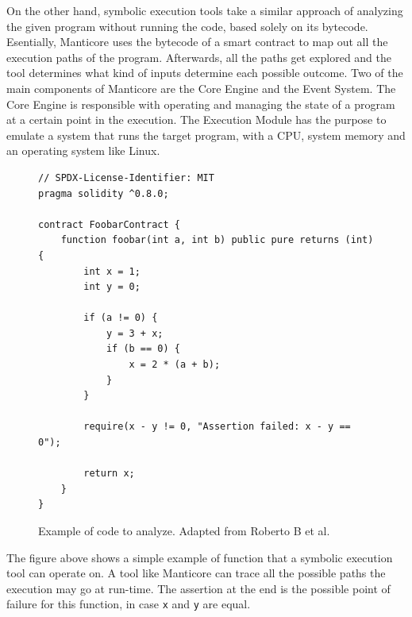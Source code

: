 On the other hand, symbolic execution tools \cite{symbolicExecutionDef} take a similar approach of analyzing the given program without running the code, based solely on its bytecode. Esentially, Manticore \cite{manticore} uses the bytecode of a smart contract to map out all the execution paths of the program. Afterwards, all the paths get explored and the tool determines what kind of inputs determine each possible outcome. Two of the main components of Manticore are the Core Engine and the Event System. The Core Engine is responsible with operating and managing the state of a program at a certain point in the execution. The Execution Module has the purpose to emulate a system that runs the target program, with a CPU, system memory and an operating system like Linux.

\begin{figure}[H]
\centering
\begin{BVerbatim}
// SPDX-License-Identifier: MIT
pragma solidity ^0.8.0;

contract FoobarContract {
    function foobar(int a, int b) public pure returns (int) {
        int x = 1;
        int y = 0;

        if (a != 0) {
            y = 3 + x;
            if (b == 0) {
                x = 2 * (a + b);
            }
        }

        require(x - y != 0, "Assertion failed: x - y == 0");

        return x;
    }
}

\end{BVerbatim}
\caption{Example of code to analyze. Adapted from Roberto B et al. \cite{symbolicExecutionDef}}
\end{figure}

The figure above shows a simple example of function that a symbolic execution tool can operate on. A tool like Manticore can trace all the possible paths the execution may go at run-time. The assertion at the end is the possible point of failure for this function, in case \texttt{x} and \texttt{y} are equal.

